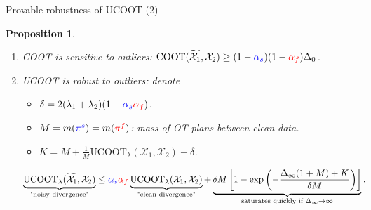 \documentclass{beamer}
\newcommand{\coot}{\text{COOT}}
\newcommand{\ucoot}{\text{UCOOT}}
\newcommand{\cX}{\mathcal X}
\newcommand{\pis}{{\color{blue}{\pi^s}}}
\newcommand{\pif}{{\color{red}{\pi^f}}}
\newtheorem{proposition}{Proposition}[section]
\begin{document}
\begin{frame}{Provable robustness of UCOOT (2)}
\scriptsize
\vspace{-0.2cm}
\begin{proposition}
  \begin{enumerate}
    \setlength\itemsep{0em}
    \item COOT is sensitive to outliers:
    $\coot(\widetilde{\cX_1}, \cX_2) \geq (1 - {\color{blue}{\alpha_s}})(1 - {\color{red}{\alpha_f}})\Delta_0$.

    \item UCOOT is robust to outliers: denote
    \begin{itemize}
      \scriptsize
      \item $\delta = 2(\lambda_1 + \lambda_2)(1 - {\color{blue}{\alpha_s}} {\color{red}{\alpha_f}})$.

      \item $M= m(\pis) = m(\pif)$: mass of OT plans between clean data.

      \item $K = M + \frac{1}{M}\ucoot_{\lambda}(\cX_1, \cX_2) + \delta$.
    \end{itemize}
    \begin{equation*} %
    \begin{split}
      \underbrace{\ucoot_{\lambda}(\widetilde{\cX_1}, \cX_2)}_{\text{"noisy divergence"}}
      &\leq {\color{blue}{\alpha_s}} {\color{red}{\alpha_f}}
      \underbrace{\ucoot_{\lambda}(\cX_1, \cX_2)}_{\text{"clean divergence"}}
      + \underbrace{\delta M \left[ 1 -
      \exp \left( {- \frac{\Delta_{\infty}(1+M) + K}{\delta M}} \right) \right]}_{\text{saturates quickly if } \Delta_{\infty} \to \infty}.
    \end{split}
    \end{equation*}
  \end{enumerate}
\end{proposition}


\end{frame}
\end{document}
